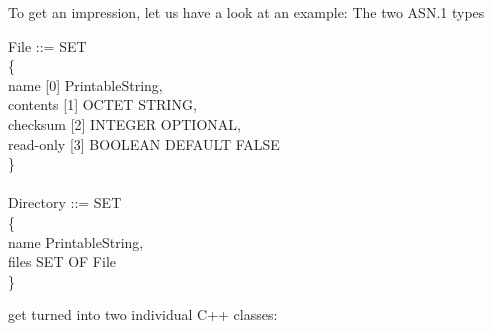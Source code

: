 To get an impression, let us have a look at an example:
The two ASN.1 types
\begin{ASNcode}
File ::= SET\\
\{\+\\
  name [0] PrintableString,\\
  contents [1] OCTET STRING,\\
  checksum [2] INTEGER OPTIONAL,\\
  read-only [3] BOOLEAN DEFAULT FALSE\-\\
\}\\
\\
Directory ::= SET\\
\{\+\\
  name PrintableString,\\
  files SET OF File\-\\
\}
\end{ASNcode}

get turned into two individual C++ classes:

